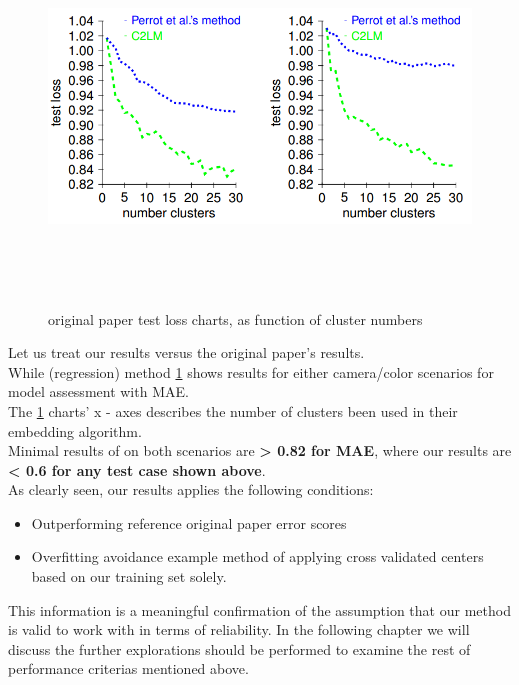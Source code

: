 \begin{figure}[H] 
	\includegraphics[width=\linewidth,height=10cm,keepaspectratio]{Figures/orig_paper_charts}
	\caption[orig res]
	{original paper test loss charts, as function of cluster numbers}
	\label{original paper results}			
\end{figure}


Let us treat our results versus the original paper's results.\\

While \cite{perp_color} (regression) method
\ref{original paper results} shows results for either camera/color scenarios for model assessment with MAE. \\
The \ref{original paper results} charts' x - axes describes the number of clusters been used in their embedding algorithm. \\
Minimal results of \cite{perp_color} on both scenarios are \textbf{ > 0.82 for MAE}, where our results are \textbf{ < 0.6 for any test case shown above}. \\
As clearly seen, our results applies the following conditions:
\begin{itemize}
	\item Outperforming reference original paper error scores
	\item Overfitting avoidance example method of applying cross validated centers based on our training set solely.
\end{itemize}

This information is a meaningful confirmation of the assumption that our method is valid to work with in terms of reliability. In the following chapter we will discuss the further explorations should be performed to examine the rest of performance criterias mentioned above.

